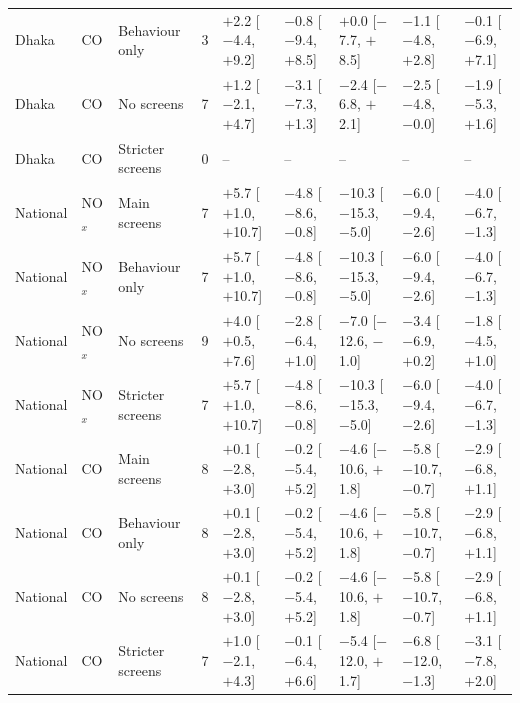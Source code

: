 \begin{longtable}{L{1.3cm} L{1.0cm} L{2.0cm} C{0.4cm} C{1.9cm} C{1.9cm} C{1.9cm} C{1.9cm} C{1.9cm}}
Dhaka & CO & Behaviour only & 3 & $+$2.2 {\scriptsize[$-$4.4, $+$9.2]} & $-$0.8 {\scriptsize[$-$9.4, $+$8.5]} & $+$0.0 {\scriptsize[$-$7.7, $+$8.5]} & $-$1.1 {\scriptsize[$-$4.8, $+$2.8]} & $-$0.1 {\scriptsize[$-$6.9, $+$7.1]} \\
Dhaka & CO & No screens & 7 & $+$1.2 {\scriptsize[$-$2.1, $+$4.7]} & $-$3.1 {\scriptsize[$-$7.3, $+$1.3]} & $-$2.4 {\scriptsize[$-$6.8, $+$2.1]} & $-$2.5 {\scriptsize[$-$4.8, $-$0.0]} & $-$1.9 {\scriptsize[$-$5.3, $+$1.6]} \\
Dhaka & CO & Stricter screens & 0 & -- & -- & -- & -- & -- \\
National & NO$_x$ & Main screens & 7 & $+$5.7 {\scriptsize[$+$1.0, $+$10.7]} & $-$4.8 {\scriptsize[$-$8.6, $-$0.8]} & $-$10.3 {\scriptsize[$-$15.3, $-$5.0]} & $-$6.0 {\scriptsize[$-$9.4, $-$2.6]} & $-$4.0 {\scriptsize[$-$6.7, $-$1.3]} \\
National & NO$_x$ & Behaviour only & 7 & $+$5.7 {\scriptsize[$+$1.0, $+$10.7]} & $-$4.8 {\scriptsize[$-$8.6, $-$0.8]} & $-$10.3 {\scriptsize[$-$15.3, $-$5.0]} & $-$6.0 {\scriptsize[$-$9.4, $-$2.6]} & $-$4.0 {\scriptsize[$-$6.7, $-$1.3]} \\
National & NO$_x$ & No screens & 9 & $+$4.0 {\scriptsize[$+$0.5, $+$7.6]} & $-$2.8 {\scriptsize[$-$6.4, $+$1.0]} & $-$7.0 {\scriptsize[$-$12.6, $-$1.0]} & $-$3.4 {\scriptsize[$-$6.9, $+$0.2]} & $-$1.8 {\scriptsize[$-$4.5, $+$1.0]} \\
National & NO$_x$ & Stricter screens & 7 & $+$5.7 {\scriptsize[$+$1.0, $+$10.7]} & $-$4.8 {\scriptsize[$-$8.6, $-$0.8]} & $-$10.3 {\scriptsize[$-$15.3, $-$5.0]} & $-$6.0 {\scriptsize[$-$9.4, $-$2.6]} & $-$4.0 {\scriptsize[$-$6.7, $-$1.3]} \\
National & CO & Main screens & 8 & $+$0.1 {\scriptsize[$-$2.8, $+$3.0]} & $-$0.2 {\scriptsize[$-$5.4, $+$5.2]} & $-$4.6 {\scriptsize[$-$10.6, $+$1.8]} & $-$5.8 {\scriptsize[$-$10.7, $-$0.7]} & $-$2.9 {\scriptsize[$-$6.8, $+$1.1]} \\
National & CO & Behaviour only & 8 & $+$0.1 {\scriptsize[$-$2.8, $+$3.0]} & $-$0.2 {\scriptsize[$-$5.4, $+$5.2]} & $-$4.6 {\scriptsize[$-$10.6, $+$1.8]} & $-$5.8 {\scriptsize[$-$10.7, $-$0.7]} & $-$2.9 {\scriptsize[$-$6.8, $+$1.1]} \\
National & CO & No screens & 8 & $+$0.1 {\scriptsize[$-$2.8, $+$3.0]} & $-$0.2 {\scriptsize[$-$5.4, $+$5.2]} & $-$4.6 {\scriptsize[$-$10.6, $+$1.8]} & $-$5.8 {\scriptsize[$-$10.7, $-$0.7]} & $-$2.9 {\scriptsize[$-$6.8, $+$1.1]} \\
National & CO & Stricter screens & 7 & $+$1.0 {\scriptsize[$-$2.1, $+$4.3]} & $-$0.1 {\scriptsize[$-$6.4, $+$6.6]} & $-$5.4 {\scriptsize[$-$12.0, $+$1.7]} & $-$6.8 {\scriptsize[$-$12.0, $-$1.3]} & $-$3.1 {\scriptsize[$-$7.8, $+$2.0]} \\
\end{longtable}
\endgroup
